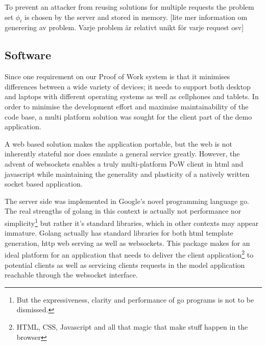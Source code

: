 To prevent an attacker from reusing solutions for multiple requests the problem set $\phi_i$ is chosen by the server and stored in memory.
[lite mer information om generering av problem. Varje problem är relativt unikt för varje request osv]


\subsection{Software}
Since one requirement on our Proof of Work system is that it minimises differences between a wide variety of devices; it needs to support both desktop and laptops with different operating systems as well as cellphones and tablets.
In order to minimise the development effort and maximise maintainability of the code base, a multi platform solution was sought for the client part of the demo application. 

A web based solution makes the application portable, but the web is not inherently stateful nor does emulate a general service greatly. However, the advent of websockets enables a truly multi-platform PoW client in html and javascript while maintaining the generality and plasticity of a natively written socket based application. 
\begin{comment}
The javascript implementation for handling the protocol is quite simple:
\jscode[firstline=57, firstnumber=57, lastline=84]{../pow.js}
The solution finding part also need to be presented:
\jscode[firstline=26, firstnumber=26, lastline=49]{../pow.js}
To trigger a request to be sent to the server we build the following function which is then registered to the onclick event of a button in the web gui:
\jscode[firstline=100, firstnumber=100, lastline=105]{../pow.js}
\end{comment}

The server side was implemented in Google's novel programming language go\cite{golang}. The real strengths of golang in this context is actually not performance nor simplicity\footnote{But the expressiveness, clarity and performance of go programs is not to be dismissed.} but rather it's standard libraries, which in other contexts may appear immature. Golang actually has standard libraries for both html template generation, http web serving as well as websockets. This package makes for an ideal platform for an application that needs to deliver the client application\footnote{HTML, CSS, Javascript and all that magic that make stuff happen in the browser} to potential clients as well as servicing clients requests in the model application reachable through the websocket interface. 

